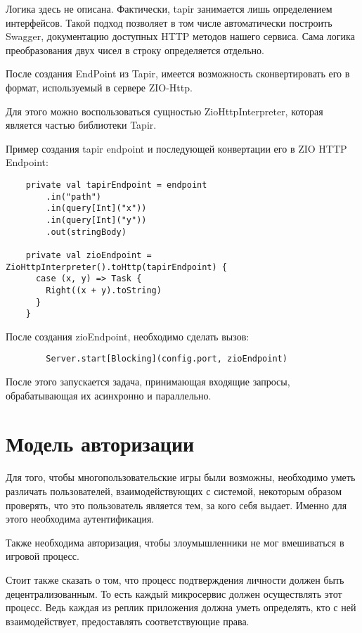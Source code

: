 \documentclass[14pt]{extarticle}
\begin{document}
    Логика здесь не описана. Фактически, tapir занимается лишь определением интерфейсов. Такой подход позволяет в том числе
    автоматически построить Swagger, документацию доступных HTTP методов нашего сервиса. Сама логика преобразования двух чисел в строку определяется отдельно.

    После создания EndPoint из Tapir, имеется возможность сконвертировать его в формат,
    используемый в сервере ZIO-Http.

    Для этого можно воспользоваться сущностью ZioHttpInterpreter, которая является частью библиотеки Tapir.

    Пример создания tapir endpoint и последующей конвертации его в ZIO HTTP Endpoint:

    \begin{verbatim}
    private val tapirEndpoint = endpoint
        .in("path")
        .in(query[Int]("x"))
        .in(query[Int]("y"))
        .out(stringBody)

    private val zioEndpoint = ZioHttpInterpreter().toHttp(tapirEndpoint) {
      case (x, y) => Task {
        Right((x + y).toString)
      }
    }
    \end{verbatim}

    После создания zioEndpoint, необходимо сделать вызов:

    \begin{verbatim}
        Server.start[Blocking](config.port, zioEndpoint)
    \end{verbatim}

    После этого запускается задача, принимающая входящие запросы, обрабатывающая их асинхронно и параллельно.

    \section{Модель авторизации}

    Для того, чтобы
    многопользовательские игры были
    возможны, необходимо уметь различать пользователей, взаимодействующих с системой,
    некоторым образом проверять, что это пользователь является тем, за кого себя выдает. Именно для этого необходима аутентификация.

    Также необходима авторизация, чтобы злоумышленники не мог вмешиваться в игровой процесс.

    Стоит также сказать о том, что процесс подтверждения личности должен быть децентрализованным. То есть каждый
    микросервис должен осуществлять этот процесс. Ведь каждая из реплик приложения должна уметь определять,
    кто с ней взаимодействует, предоставлять соответствующие права.
\end{document}
